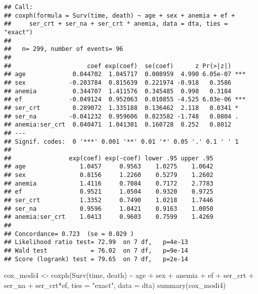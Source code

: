 \documentclass[
]{article}
\newenvironment{Shaded}{\begin{snugshade}}{\end{snugshade}}
\newcommand{\AttributeTok}[1]{\textcolor[rgb]{0.77,0.63,0.00}{#1}}
\newcommand{\FunctionTok}[1]{\textcolor[rgb]{0.00,0.00,0.00}{#1}}
\newcommand{\NormalTok}[1]{#1}
\newcommand{\OtherTok}[1]{\textcolor[rgb]{0.56,0.35,0.01}{#1}}
\newcommand{\SpecialCharTok}[1]{\textcolor[rgb]{0.00,0.00,0.00}{#1}}
\newcommand{\StringTok}[1]{\textcolor[rgb]{0.31,0.60,0.02}{#1}}
\begin{document}
\begin{verbatim}
## Call:
## coxph(formula = Surv(time, death) ~ age + sex + anemia + ef + 
##     ser_crt + ser_na + ser_crt * anemia, data = dta, ties = "exact")
## 
##   n= 299, number of events= 96 
## 
##                     coef exp(coef)  se(coef)      z Pr(>|z|)    
## age             0.044702  1.045717  0.008959  4.990 6.05e-07 ***
## sex            -0.203784  0.815639  0.221974 -0.918   0.3586    
## anemia          0.344707  1.411576  0.345485  0.998   0.3184    
## ef             -0.049124  0.952063  0.010855 -4.525 6.03e-06 ***
## ser_crt         0.289072  1.335188  0.136462  2.118   0.0341 *  
## ser_na         -0.041232  0.959606  0.023582 -1.748   0.0804 .  
## anemia:ser_crt  0.040471  1.041301  0.160728  0.252   0.8012    
## ---
## Signif. codes:  0 '***' 0.001 '**' 0.01 '*' 0.05 '.' 0.1 ' ' 1
## 
##                exp(coef) exp(-coef) lower .95 upper .95
## age               1.0457     0.9563    1.0275    1.0642
## sex               0.8156     1.2260    0.5279    1.2602
## anemia            1.4116     0.7084    0.7172    2.7783
## ef                0.9521     1.0504    0.9320    0.9725
## ser_crt           1.3352     0.7490    1.0218    1.7446
## ser_na            0.9596     1.0421    0.9163    1.0050
## anemia:ser_crt    1.0413     0.9603    0.7599    1.4269
## 
## Concordance= 0.723  (se = 0.029 )
## Likelihood ratio test= 72.99  on 7 df,   p=4e-13
## Wald test            = 76.02  on 7 df,   p=9e-14
## Score (logrank) test = 79.65  on 7 df,   p=2e-14
\end{verbatim}

\begin{Shaded}
\begin{Highlighting}[]
\NormalTok{cox\_modi4 }\OtherTok{\textless{}{-}} \FunctionTok{coxph}\NormalTok{(}\FunctionTok{Surv}\NormalTok{(time, death) }\SpecialCharTok{\textasciitilde{}}\NormalTok{ age }\SpecialCharTok{+}\NormalTok{ sex }\SpecialCharTok{+}\NormalTok{ anemia }\SpecialCharTok{+}\NormalTok{ ef }\SpecialCharTok{+}\NormalTok{ ser\_crt }\SpecialCharTok{+}\NormalTok{ ser\_na }\SpecialCharTok{+}\NormalTok{ ser\_crt}\SpecialCharTok{*}\NormalTok{ef, }\AttributeTok{ties =} \StringTok{"exact"}\NormalTok{, }\AttributeTok{data =}\NormalTok{ dta)}
\FunctionTok{summary}\NormalTok{(cox\_modi4)}
\end{Highlighting}
\end{Shaded}
\end{document}
